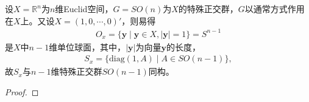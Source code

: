 \documentclass[../../main.tex]{subfiles}%
\begin{document}
\begin{example}
设$X = \mathbb{R}^n$为$n$维Euclid空间，$G = SO(n)$为$X$的特殊正交群，$G$以通常方式作用在$X$上。又设$X = (1, 0, \cdots, 0)'$，则易得
\begin{align*}
O_x = \{\boldsymbol{y} \mid \boldsymbol{y} \in X, |\boldsymbol{y}| = 1\} = S^{n-1}
\end{align*}
是$X$中$n-1$维单位球面，其中，$|\boldsymbol{y}|$为向量$\boldsymbol{y}$的长度，
\begin{align*}
S_x = \{\text{diag}(1, A) \mid A \in SO(n-1)\},
\end{align*}
故$S_x$与$n-1$维特殊正交群$SO(n-1)$同构。
\end{example}
\begin{proof}

\end{proof}
\end{document}
